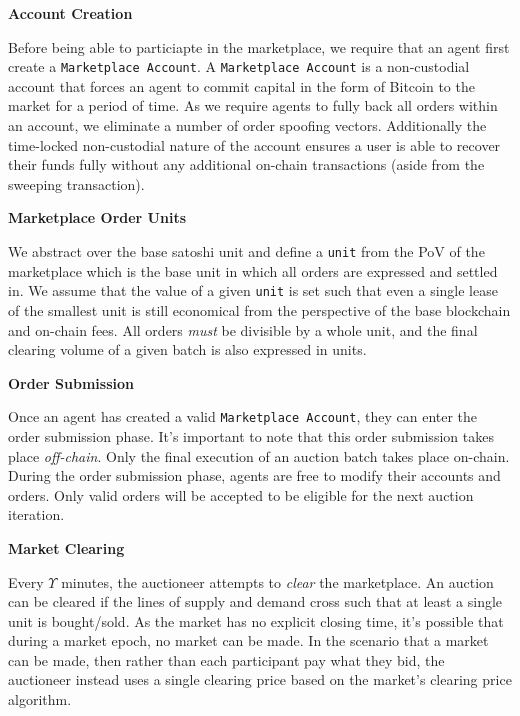 \documentclass[12pt,a4paper]{article}
\theoremstyle{definition}
\begin{document}
\begin{center}
    \textbf{Account Creation}
\end{center}

Before being able to particiapte in the marketplace, we require that an agent
first create a \texttt{Marketplace Account}. A \texttt{Marketplace Account} is
a non-custodial account that forces an agent to commit capital in the form of
Bitcoin to the market for a period of time. As we require agents to fully back
all orders within an account, we eliminate a number of order spoofing vectors.
Additionally the time-locked non-custodial nature of the account ensures a user
is able to recover their funds fully without any additional on-chain
transactions (aside from the sweeping transaction).

\begin{center}
    \textbf{Marketplace Order Units}
\end{center}

We abstract over the base satoshi unit and define a \texttt{unit} from the PoV
of the marketplace which is the base unit in which all orders are expressed and
settled in. We assume that the value of a given \texttt{unit} is set such that
even a single lease of the smallest unit is still economical from the
perspective of the base blockchain and on-chain fees. All orders \emph{must} be
divisible by a whole unit, and the final clearing volume of a given batch is
also expressed in units.

\begin{center}
    \textbf{Order Submission}
\end{center}

Once an agent has created a valid \texttt{Marketplace Account}, they can enter
the order submission phase. It's important to note that this order submission
takes place \emph{off-chain}. Only the final execution of an auction batch
takes place on-chain. During the order submission phase, agents are free to
modify their accounts and orders. Only valid orders will be accepted to be
eligible for the next auction iteration.

\begin{center}
    \textbf{Market Clearing}
\end{center}

Every $\Upsilon$ minutes, the auctioneer attempts to \emph{clear} the marketplace.
An auction can be cleared if the lines of supply and demand cross such that at
least a single unit is bought/sold. As the market has no explicit closing time,
it's possible that during a market epoch, no market can be made. In the
scenario that a market can be made, then rather than each participant pay what
they bid, the auctioneer instead uses a single clearing price based on the
market's clearing price algorithm.
\end{document}
